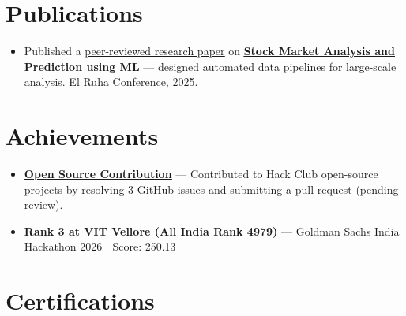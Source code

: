 \documentclass[a4paper,10pt]{article}
\newcommand{\ulink}[2]{\href{#1}{\uline{#2}}}
\begin{document}
\vspace{2pt}

\section{Publications}
\vspace{2pt}
\begin{itemize}[nosep, leftmargin=1.5em, itemsep=1pt, topsep=2pt]
  \item {\color[HTML]{0A0A0A}\fontsize{11}{14}\selectfont
  Published a \ulink{https://www.elruha.org/_files/ugd/614b1f_6b95e1b697bf452b9907ba46e0151c05.pdf\#page=774}{peer-reviewed research paper} on \ulink{https://github.com/su-jin1425/Set-Project}{\textbf{Stock Market Analysis and Prediction using ML}} --- designed automated data pipelines for large-scale analysis. \ulink{https://www.elruha.org/congress-books}{El Ruha Conference}, 2025.}
\end{itemize}

\vspace{2pt}

\section{Achievements}
\vspace{2pt}
\begin{itemize}[nosep, leftmargin=1.5em, itemsep=1pt, topsep=2pt]
  \item {\color[HTML]{0A0A0A}\fontsize{11}{14}\selectfont \ulink{https://github.com/hackclub/stardance/graphs/contributors?all=1}{\textbf{Open Source Contribution}} --- Contributed to Hack Club open-source projects by resolving 3 GitHub issues and submitting a pull request (pending review).}
  \item {\color[HTML]{0A0A0A}\fontsize{11}{14}\selectfont \textbf{Rank 3 at VIT Vellore (All India Rank 4979)} --- Goldman Sachs India Hackathon 2026 $|$ Score: 250.13}
\end{itemize}

\vspace{2pt}

\section{Certifications}
\vspace{2pt}
\end{document}
